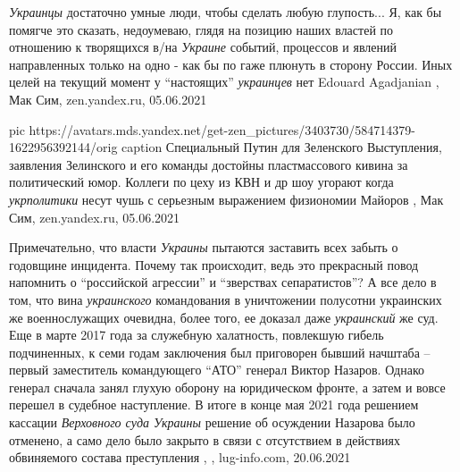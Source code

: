\emph{Украинцы} достаточно умные люди, чтобы сделать любую глупость...  Я, как
бы помягче это сказать, недоумеваю, глядя на позицию наших властей по отношению
к творящихся в/на \emph{Украине} событий, процессов и явлений направленных
только на одно - как бы по гаже плюнуть в сторону России. Иных целей на текущий
момент у \enquote{настоящих} \emph{украинцев} нет
Edouard Agadjanian
, 
Мак Сим, zen.yandex.ru, 05.06.2021

\ifcmt
  pic https://avatars.mds.yandex.net/get-zen_pictures/3403730/584714379-1622956392144/orig
  caption Специальный Путин для Зеленского
\fi
Выступления, заявления Зелинского и его команды достойны пластмассового кивина
за политический юмор. Коллеги по цеху из КВН и др шоу угорают когда \emph{укрполитики}
несут чушь с серьезным выражением физиономии
Майоров
, 
Мак Сим, zen.yandex.ru, 05.06.2021

Примечательно, что власти \emph{Украины} пытаются заставить всех забыть о годовщине
инцидента. Почему так происходит, ведь это прекрасный повод напомнить о
\enquote{российской агрессии} и \enquote{зверствах сепаратистов}? А все дело в том, что вина
\emph{украинского} командования в уничтожении полусотни украинских же военнослужащих
очевидна, более того, ее доказал даже \emph{украинский} же суд. Еще в марте 2017 года
за служебную халатность, повлекшую гибель подчиненных, к семи годам заключения
был приговорен бывший начштаба – первый заместитель командующего \enquote{АТО} генерал
Виктор Назаров. Однако генерал сначала занял глухую оборону на юридическом
фронте, а затем и вовсе перешел в судебное наступление. В итоге в конце мая
2021 года решением кассации \emph{Верховного суда Украины} решение об осуждении
Назарова было отменено, а само дело было закрыто в связи с отсутствием в
действиях обвиняемого состава преступления
, 
, lug-info.com, 20.06.2021


